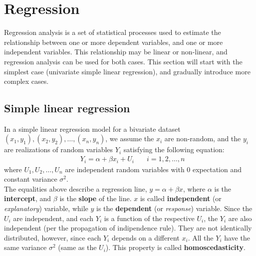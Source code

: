 \section{Regression}

Regression analysis is a set of statistical processes used to estimate the relationship between one or more dependent variables, and one or more independent variables. This relationship may be linear or non-linear, and regression analysis can be used for both cases. This section will start with the simplest case (univariate simple linear regression), and gradually introduce more complex cases.

\subsection{Simple linear regression}

In a simple linear regression model for a bivariate dataset $(x_1, y_1), (x_2, y_2), \ldots, (x_n, y_n)$, we assume the $x_i$ are non-random, and the $y_i$ are realizations of random variables $Y_i$ satisfying the following equation:
\begin{align*}
    &Y_i = \alpha + \beta x_i + U_i &\quad i = 1, 2, \ldots, n
\end{align*} 
where $U_1, U_2, \ldots, U_n$ are independent random variables with 0 expectation and constant variance $\sigma^2$. \\
The equalities above describe a regression line, $y = \alpha + \beta x$, where $\alpha$ is the \textbf{intercept}, and $\beta$ is the \textbf{slope} of the line. $x$ is called \textbf{independent} (or \textit{explanatory}) variable, while $y$ is the \textbf{dependent} (or \textit{response}) variable. Since the $U_i$ are independent, and each $Y_i$ is a function of the respective $U_i$, the $Y_i$ are also independent (per the propagation of indipendence rule). They are not identically distributed, however, since each $Y_i$ depends on a different $x_i$. All the $Y_i$ have the same variance $\sigma^2$ (same as the $U_i$). This property is called \textbf{homoscedasticity}.

